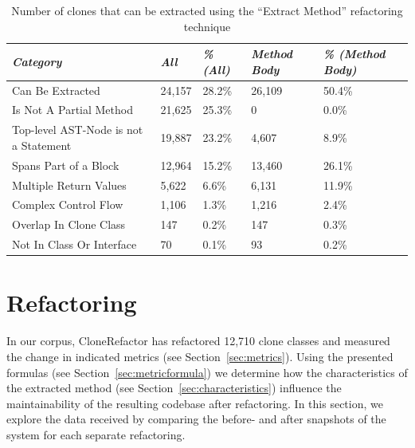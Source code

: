 \begin{table}[H]
\centering
\begin{tabular}{@{}lllll@{}}
\toprule
\textit{\textbf{Category}} & \textit{\textbf{All}} & \textit{\textbf{\% (All)}} & \textit{\textbf{Method Body}} & \textit{\textbf{\% (Method Body)}} \\ \midrule
Can Be Extracted & 24,157 & 28.2\% & 26,109 & 50.4\% \\
Is Not A Partial Method & 21,625 & 25.3\% & 0 & 0.0\% \\
Top-level AST-Node is not a Statement & 19,887 & 23.2\% & 4,607 & 8.9\% \\
Spans Part of a Block & 12,964 & 15.2\% & 13,460 & 26.1\% \\
Multiple Return Values & 5,622 & 6.6\% & 6,131 & 11.9\% \\
Complex Control Flow & 1,106 & 1.3\% & 1,216 & 2.4\% \\
Overlap In Clone Class & 147 & 0.2\% & 147 & 0.3\% \\
Not In Class Or Interface & 70 & 0.1\% & 93 & 0.2\% \\
\bottomrule
\end{tabular}
\caption{Number of clones that can be extracted using the ``Extract Method'' refactoring technique}
\label{tab:refactorability}
\end{table}

\section{Refactoring} \label{sec:refactoringexperiments}
In our corpus, CloneRefactor has refactored 12,710 clone classes and measured the change in indicated metrics (see Section~\ref{sec:metrics}). Using the presented formulas (see Section~\ref{sec:metricformula}) we determine how the characteristics of the extracted method (see Section~\ref{sec:characteristics}) influence the maintainability of the resulting codebase after refactoring. In this section, we explore the data received by comparing the before- and after snapshots of the system for each separate refactoring.

